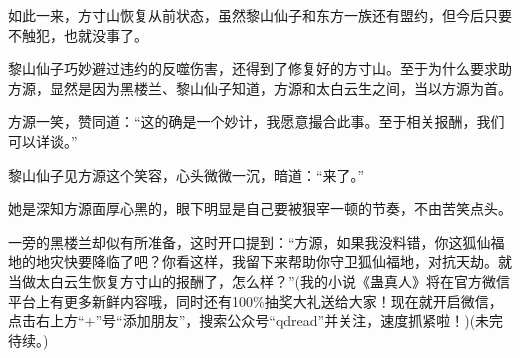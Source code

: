 \begin{this_body}
如此一来，方寸山恢复从前状态，虽然黎山仙子和东方一族还有盟约，但今后只要不触犯，也就没事了。

黎山仙子巧妙避过违约的反噬伤害，还得到了修复好的方寸山。至于为什么要求助方源，显然是因为黑楼兰、黎山仙子知道，方源和太白云生之间，当以方源为首。

方源一笑，赞同道：“这的确是一个妙计，我愿意撮合此事。至于相关报酬，我们可以详谈。”

黎山仙子见方源这个笑容，心头微微一沉，暗道：“来了。”

她是深知方源面厚心黑的，眼下明显是自己要被狠宰一顿的节奏，不由苦笑点头。

一旁的黑楼兰却似有所准备，这时开口提到：“方源，如果我没料错，你这狐仙福地的地灾快要降临了吧？你看这样，我留下来帮助你守卫狐仙福地，对抗天劫。就当做太白云生恢复方寸山的报酬了，怎么样？”(我的小说《蛊真人》将在官方微信平台上有更多新鲜内容哦，同时还有100\%抽奖大礼送给大家！现在就开启微信，点击右上方“+”号“添加朋友”，搜索公众号“qdread”并关注，速度抓紧啦！)(未完待续。)

\end{this_body}

